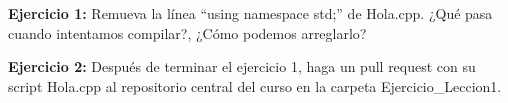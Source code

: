 \documentclass[10.5pt]{article}
\begin{document}
{\textbf{Ejercicio 1:}} Remueva la línea ``using namespace std;'' de Hola.cpp. ¿Qué pasa cuando intentamos compilar?, ¿Cómo podemos arreglarlo?

{\textbf{Ejercicio 2:}} Después de terminar el ejercicio 1, haga un pull request con su script Hola.cpp al repositorio central del curso en la carpeta Ejercicio\_Leccion1.




%
\end{document}
